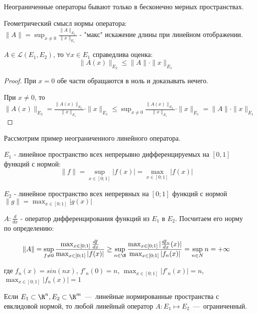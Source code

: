 \begin{note}
    Неограниченные операторы бывают только в бесконечно мерных пространствах.
\end{note}

\begin{note}
    Геометрический смысл нормы оператора: \\
    $\|A\| = \sup_{x \neq 0}{\frac{\|A\|_{E_2}}{\|x\|_{E_1}}}$ - "макс" искажение длины при линейном отображении.
\end{note}

\begin{lemma}
    $A \in \mathcal{L}(E_1, E_2)$, то $\forall x \in E_1$ справедлива оценка:
    \[\|A(x)\|_{E_2} \leq \|A\| \cdot \|x\|_{E_1}\]
\end{lemma}

\begin{proof}
    При $x = 0$ обе части обращаются в ноль и доказывать нечего.

    При $x \neq 0$, то $\|A(x)\|_{E_2} = \frac{\|A(x)\|_{E_2}}{\|x\|_{E_1}} \cdot \|x\|_{E_1} \leq \sup_{x \neq 0}{\frac{\|A(x)\|_{E_2}}{\|x\|_{E_1}}} \cdot \|x\|_{E_1} = \|A\| \cdot \|x\|_{E_1} $
\end{proof}


\begin{note}
    Рассмотрим пример неограниченного линейного оператора.
    
    $E_1$ - линейное пространство всех непрерывно дифференцируемых на $[0, 1]$ функций с нормой: 
    \[\|f \| = \sup_{x \in [0; 1]}{|f(x)|} = \max_{x \in [0; 1]}{|f(x)|}\] 

    $E_2$ - линейное пространство всех непрервных на $[0; 1]$ функций с нормой $\|g\| = \max_{x \in [0; 1]}{|g(x)|}$

    $A: \frac{d}{dx}$ - оператор дифференцирования функций из $E_1$ в $E_2$.
    Посчитаем его норму по определению:

    \[\| A \| = \sup_{f \neq 0}{\frac{\max_{x \in [0; 1]}{\frac{df}{dx}}}{\max_{x \in [0; 1]}{|f(x)|}}} \geq \sup_{n \in \N}{\frac{\max_{x \in [0; 1]}{|\frac{df_n}{dx}(x)}|}{\max_{x \in [0; 1]}{|f_n(x)|}}} = \sup_{n \in N} n = +\infty\]

    где $f_n(x) = sin(nx)$, $f'_n(0) = n$, $\max_{x \in [0; 1]}{|f'_n(x)|} = n$, $\max_{x \in [0; 1]}{|f_n(x)|} = 1$
\end{note}


\begin{theorem}
    Если $E_1 \subset \R^n, E_2 \subset \R^m$~---~линейные нормированные пространства с евклидовой нормой, то любой линейный оператор $A: E_1 \mapsto E_2$~---~ограниченный.
\end{theorem}

